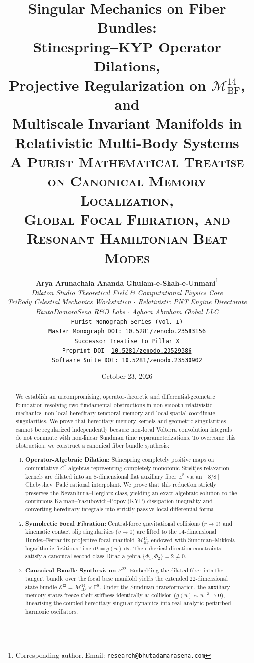 \documentclass[11pt,a4paper,reqno]{article}
\title{\textbf{\Large Singular Mechanics on Fiber Bundles:\\
Stinespring--KYP Operator Dilations,\\
Projective Regularization on $\mathcal{M}_{\mathrm{BF}}^{14}$, and\\
Multiscale Invariant Manifolds in Relativistic Multi-Body Systems}\\[1.0ex]
\normalsize \textsc{A Purist Mathematical Treatise on Canonical Memory Localization,\\
Global Focal Fibration, and Resonant Hamiltonian Beat Modes}}
\author{
  \textbf{Arya Arunachala Ananda Ghulam-e-Shah-e-Unmani}\thanks{Corresponding author. Email: \texttt{research@bhutadamarasena.com}}\\[1.0ex]
  \textit{Dilaton Studio Theoretical Field \& Computational Physics Core}\\
  \textit{TriBody Celestial Mechanics Workstation $\cdot$ Relativistic PNT Engine Directorate}\\
  \textit{BhutaDamaraSena R\&D Labs $\cdot$ Aghora Abraham Global LLC}\\
  \texttt{Purist Monograph Series (Vol.~I)}\\
  \texttt{Master Monograph DOI: \href{https://doi.org/10.5281/zenodo.23583156}{10.5281/zenodo.23583156}}\\[0.4ex]
  \texttt{Successor Treatise to Pillar X}\\
  \texttt{Preprint DOI: \href{https://doi.org/10.5281/zenodo.23529386}{10.5281/zenodo.23529386}}\\
  \texttt{Software Suite DOI: \href{https://doi.org/10.5281/zenodo.23530902}{10.5281/zenodo.23530902}}
}
\date{October 23, 2026}
\theoremstyle{plain}
\theoremstyle{definition}
\theoremstyle{remark}
\numberwithin{equation}{section}
\begin{document}
\maketitle

\begin{abstract}
\noindent
We establish an uncompromising, operator-theoretic and differential-geometric foundation resolving two fundamental obstructions in non-smooth relativistic mechanics: non-local hereditary temporal memory and local spatial coordinate singularities. We prove that hereditary memory kernels and geometric singularities cannot be regularized independently because non-local Volterra convolution integrals do not commute with non-linear Sundman time reparameterizations. To overcome this obstruction, we construct a canonical fiber bundle synthesis:
\begin{enumerate}[label=\textbf{(\roman*)}, leftmargin=2.2em]
  \item \textbf{Operator-Algebraic Dilation:} Stinespring completely positive maps on commutative $C^*$-algebras representing completely monotonic Stieltjes relaxation kernels are dilated into an 8-dimensional flat auxiliary fiber $\mathbb{E}^8$ via an $[8/8]$ Chebyshev--Pad\'{e} rational interpolant. We prove that this reduction strictly preserves the Nevanlinna--Herglotz class, yielding an exact algebraic solution to the continuous Kalman--Yakubovich--Popov (KYP) dissipation inequality and converting hereditary integrals into strictly passive local differential forms.
  \item \textbf{Symplectic Focal Fibration:} Central-force gravitational collisions ($r \to 0$) and kinematic contact slip singularities ($v \to 0$) are lifted to the 14-dimensional Burdet--Ferrandiz projective focal manifold $\mathcal{M}_{\mathrm{BF}}^{14}$ endowed with Sundman--Mikkola logarithmic fictitious time $\mathrm{d}t = g(u)\,\mathrm{d}s$. The spherical direction constraints satisfy a canonical second-class Dirac algebra $\{\Phi_1, \Phi_2\} = 2 \ne 0$.
  \item \textbf{Canonical Bundle Synthesis on $\mathcal{E}^{22}$:} Embedding the dilated fiber into the tangent bundle over the focal base manifold yields the extended 22-dimensional state bundle $\mathcal{E}^{22} = \mathcal{M}_{\mathrm{BF}}^{14} \times \mathbb{E}^8$. Under the Sundman transformation, the auxiliary memory states freeze their stiffness identically at collision ($g(u) \sim u^{-2} \to 0$), linearizing the coupled hereditary-singular dynamics into real-analytic perturbed harmonic oscillators.

\end{enumerate}
\end{abstract}
\end{document}
